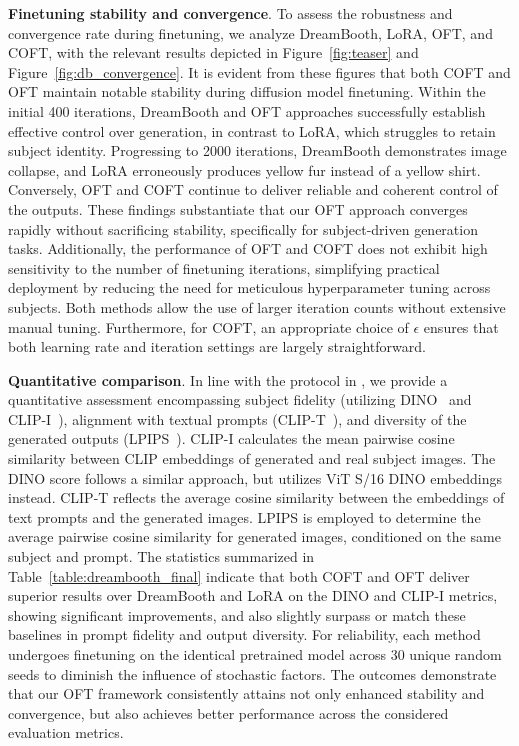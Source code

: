 \textbf{Finetuning stability and convergence}. To assess the robustness and convergence rate during finetuning, we analyze DreamBooth, LoRA, OFT, and COFT, with the relevant results depicted in Figure~\ref{fig:teaser} and Figure~\ref{fig:db_convergence}. It is evident from these figures that both COFT and OFT maintain notable stability during diffusion model finetuning. Within the initial 400 iterations, DreamBooth and OFT approaches successfully establish effective control over generation, in contrast to LoRA, which struggles to retain subject identity. Progressing to 2000 iterations, DreamBooth demonstrates image collapse, and LoRA erroneously produces yellow fur instead of a yellow shirt. Conversely, OFT and COFT continue to deliver reliable and coherent control of the outputs. These findings substantiate that our OFT approach converges rapidly without sacrificing stability, specifically for subject-driven generation tasks. Additionally, the performance of OFT and COFT does not exhibit high sensitivity to the number of finetuning iterations, simplifying practical deployment by reducing the need for meticulous hyperparameter tuning across subjects. Both methods allow the use of larger iteration counts without extensive manual tuning. Furthermore, for COFT, an appropriate choice of $\epsilon$ ensures that both learning rate and iteration settings are largely straightforward.

\textbf{Quantitative comparison}. In line with the protocol in \cite{ruiz2023dreambooth}, we provide a quantitative assessment encompassing subject fidelity (utilizing DINO~\cite{caron2021emerging} and CLIP-I~\cite{radford2021learning}), alignment with textual prompts (CLIP-T~\cite{radford2021learning}), and diversity of the generated outputs (LPIPS~\cite{zhang2018unreasonable}). CLIP-I calculates the mean pairwise cosine similarity between CLIP embeddings of generated and real subject images. The DINO score follows a similar approach, but utilizes ViT S/16 DINO embeddings instead. CLIP-T reflects the average cosine similarity between the embeddings of text prompts and the generated images. LPIPS is employed to determine the average pairwise cosine similarity for generated images, conditioned on the same subject and prompt. The statistics summarized in Table~\ref{table:dreambooth_final} indicate that both COFT and OFT deliver superior results over DreamBooth and LoRA on the DINO and CLIP-I metrics, showing significant improvements, and also slightly surpass or match these baselines in prompt fidelity and output diversity. For reliability, each method undergoes finetuning on the identical pretrained model across 30 unique random seeds to diminish the influence of stochastic factors. The outcomes demonstrate that our OFT framework consistently attains not only enhanced stability and convergence, but also achieves better performance across the considered evaluation metrics.

